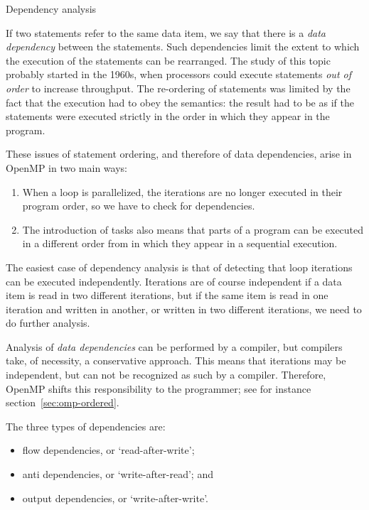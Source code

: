  {Dependency analysis}

If two statements refer to the same data item,
we say that there is a \emph{data dependency} between
the statements. Such dependencies limit the extent to which
the execution of the statements can be  rearranged.
The study of this topic probably started in the 1960s,
when processors could execute statements \emph{out of order}
to increase throughput. The re-ordering of statements
was limited by the fact that the execution
had to obey the  semantics:
the result had to be as if the statements were executed
strictly in the order in which they appear in the program.

These issues of statement ordering, and therefore of
data dependencies, arise in OpenMP in two main ways:
\begin{enumerate}
\item When a loop is parallelized, the iterations are no longer
  executed in their program order, so we have to check for dependencies.
\item The introduction of tasks also means that parts of a program
  can be executed in a different order from in which they appear
  in a sequential execution.
\end{enumerate}

The easiest case of dependency analysis is that of
detecting that loop iterations can be executed independently.
Iterations are of course independent if a data item
is read in two different iterations, but if the same
item is read in one iteration and written in another,
or written in two different iterations,
we need to do further analysis.

Analysis of \emph{data dependencies} can be performed
by a compiler, but compilers take, of necessity,
a conservative approach. This means that iterations
may be independent, but can not be recognized as such by
a compiler. Therefore, OpenMP shifts this responsibility
to the programmer; see for instance section~\ref{sec:omp-ordered}.

The three types of dependencies are:
\begin{itemize}
\item flow dependencies, or `read-after-write';
\item anti dependencies, or `write-after-read'; and
\item output dependencies, or `write-after-write'.
\end{itemize}

